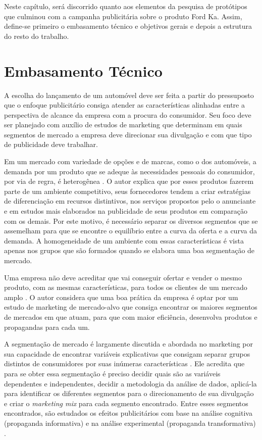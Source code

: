 \label{chap:introducao}
Neste capítulo, será discorrido quanto aos elementos da pesquisa de
protótipos que culminou com a campanha publicitária sobre o produto
Ford Ka\texttrademark. Assim, define-se primeiro o embasamento técnico
e objetivos gerais e depois a estrutura do resto do trabalho.


\section{Embasamento Técnico}

\label{sec:embasamento-tecnico}

A escolha do lançamento de um automóvel deve ser feita a partir do
pressuposto que o enfoque publicitário consiga atender as características
alinhadas entre a perspectiva de alcance da empresa com a procura
do consumidor. Seu foco deve ser planejado com auxílio de estudos
de marketing que determinam em quais segmentos de mercado a empresa
deve direcionar sua divulgação e com que tipo de publicidade deve
trabalhar. 

Em um mercado com variedade de opções e de marcas, como o dos automóveis,
a demanda por um produto que se adeque às necessidades pessoais do
consumidor, por via de regra, é heterogênea \cite{smith1956}. O autor
explica que por esses produtos fazerem parte de um ambiente competitivo,
seus fornecedores tendem a criar estratégias de diferenciação em recursos
distintivos, nos serviços propostos pelo o anunciante e em estudos
mais elaborados na publicidade de seus produtos em comparação com
os demais. Por este motivo, é necessário separar os diversos segmentos
que se assemelham para que se encontre o equilíbrio entre a curva
da oferta e a curva da demanda. A homogeneidade de um ambiente com
essas características é vista apenas nos grupos que são formados quando
se elabora uma boa segmentação de mercado. 

Uma empresa não deve acreditar que vai conseguir ofertar e vender
o mesmo produto, com as mesmas características, para todos os clientes
de um mercado amplo \cite{kotler2000}. O autor considera que uma boa
prática da empresa é optar por um estudo de marketing de mercado-alvo
que consiga encontrar os maiores segmentos de mercados em que atuam,
para que com maior eficiência, desenvolva produtos e propagandas para
cada um. 

A segmentação de mercado é largamente discutida e abordada no marketing
por sua capacidade de encontrar variáveis explicativas que consigam
separar grupos distintos de consumidores por suas inúmeras características
\cite{myers1996}. Ele acredita que para se obter essa segmentação é
preciso decidir quais são as variáveis dependentes e independentes,
decidir a metodologia da análise de dados, aplicá-la para identificar
os diferentes segmentos para o direcionamento de sua divulgação e
criar o \emph{marketing mix} para cada segmento encontrado. Entre
esses segmentos encontrados, são estudados os efeitos publicitários
com base na análise cognitiva (propaganda informativa) e na análise
experimental (propaganda transformativa) \cite{puto1984}. 


